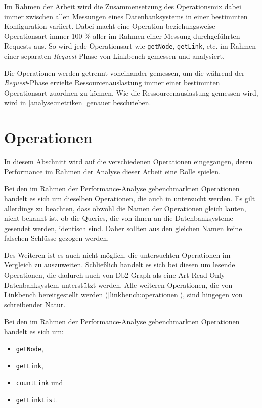 Im Rahmen der Arbeit wird die Zusammensetzung des Operationsmix dabei immer zwischen allen Messungen eines Datenbanksystems in einer bestimmten Konfiguration variiert. Dabei macht eine Operation beziehungsweise Operationsart immer 100 \% aller im Rahmen einer Messung durchgeführten Requests aus. So wird jede Operationsart wie \texttt{getNode}, \texttt{getLink}, etc. im Rahmen einer separaten \textit{Request}-Phase von Linkbench gemessen und analysiert.

Die Operationen werden getrennt voneinander gemessen, um die während der \textit{Request}-Phase erzielte Ressourcenauslastung immer einer bestimmten Operationsart zuordnen zu können. Wie die Ressourcenauslastung gemessen wird, wird in \autoref{analyse:metriken} genauer beschrieben.

\section{Operationen}
\label{analyse:operationen}
In diesem Abschnitt wird auf die verschiedenen Operationen eingegangen, deren Performance im Rahmen der Analyse dieser Arbeit eine Rolle spielen. 

Bei den im Rahmen der Performance-Analyse gebenchmarkten Operationen handelt es sich um dieselben Operationen, die auch in \cite{sigmod_tian} untersucht werden. Es gilt allerdings zu beachten, dass obwohl die Namen der Operationen gleich lauten, nicht bekannt ist, ob die Queries, die von ihnen an die Datenbanksysteme gesendet werden, identisch sind. Daher sollten aus den gleichen Namen keine falschen Schlüsse gezogen werden. 

Des Weiteren ist es auch nicht möglich, die untersuchten Operationen im Vergleich zu \cite{sigmod_tian} auszuweiten. Schließlich handelt es sich bei diesen um lesende Operationen, die dadurch auch von Db2 Graph als eine Art Read-Only-Datenbanksystem unterstützt werden. Alle weiteren Operationen, die von Linkbench bereitgestellt werden (\autoref{linkbench:operationen}), sind hingegen von schreibender Natur. 

Bei den im Rahmen der Performance-Analyse gebenchmarkten Operationen handelt es sich um:
\begin{itemize}
    \item \texttt{getNode},
    \item \texttt{getLink},
    \item \texttt{countLink} und
    \item \texttt{getLinkList}. 
\end{itemize}


